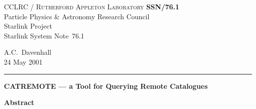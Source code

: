 \documentclass[twoside,11pt]{article}
\newcommand{\stardoccategory}  {Starlink System Note}
\newcommand{\stardocinitials}  {SSN}
\newcommand{\stardocnumber}    {76.1}
\newcommand{\stardocauthors}   {A.C.~Davenhall}
\newcommand{\stardocdate}      {24 May 2001}
\newcommand{\stardoctitle}     {CATREMOTE --- a Tool for Querying Remote
Catalogues}
\newcommand{\stardocname}{\stardocinitials /\stardocnumber}
\newenvironment{latexonly}{}{}
\renewcommand{\_}{\texttt{\symbol{95}}}
\begin{document}
\thispagestyle{empty}

\begin{latexonly}
   CCLRC / \textsc{Rutherford Appleton Laboratory} \hfill \textbf{\stardocname}\\
   {\large Particle Physics \& Astronomy Research Council}\\
   {\large Starlink Project\\}
   {\large \stardoccategory\ \stardocnumber}
   \begin{flushright}
   \stardocauthors\\
   \stardocdate
   \end{flushright}
   \vspace{-4mm}
   \rule{\textwidth}{0.5mm}
   \vspace{5mm}
   \begin{center}
   {\Large\textbf{\stardoctitle}}
   \end{center}
   \vspace{5mm}

   \vspace{10mm}
   \begin{center}
      {\Large\textbf{Abstract}}
   \end{center}
\end{latexonly}
\end{document}
